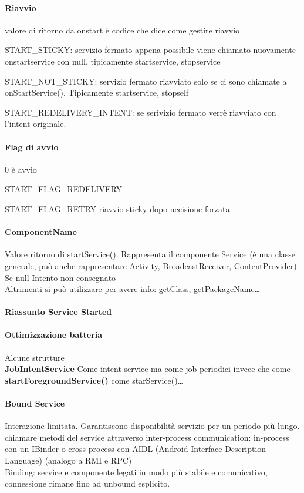 \documentclass[10pt]{book}
\begin{document}
\paragraph{Riavvio} valore di ritorno da onstart è codice che dice come gestire riavvio
\begin{list}{}{}
	\item START\_STICKY: servizio fermato appena possibile viene chiamato nuovamente onstartservice con null. tipicamente startservice, stopservice
	\item START\_NOT\_STICKY: servizio fermato riavviato solo se ci sono chiamate a onStartService(). Tipicamente startservice, stopself
	\item START\_REDELIVERY\_INTENT: se serivizio fermato verrè riavviato con l'intent originale.
\end{list}
\paragraph{Flag di avvio}
	\begin{list}{}{}
		\item 0 è avvio
		\item START\_FLAG\_REDELIVERY
		\item START\_FLAG\_RETRY riavvio sticky dopo uccisione forzata
	\end{list}
\paragraph{ComponentName} Valore ritorno di startService(). Rappresenta il componente Service (è una classe generale, può anche rappresentare Activity, BroadcastReceiver, ContentProvider)\\
Se null Intento non consegnato\\
Altrimenti si può utilizzare per avere info: getClass, getPackageName\ldots
\paragraph{Riassunto Service Started} %
\paragraph{Ottimizzazione batteria} Alcune strutture\\
\textbf{JobIntentService} Come intent service ma come job periodici invece che come\\\textbf{startForegroundService()} come starService()\ldots
\paragraph{Bound Service} Interazione limitata. Garantiscono disponibilità servizio per un periodo più lungo. chiamare metodi del service attraverso inter-process communication: in-process con un IBinder o cross-process con AIDL (Android Interface Description Language) (analogo a RMI e RPC)\\
Binding: service e componente legati in modo più stabile e comunicativo, connessione rimane fino ad unbound esplicito.
\end{document}
